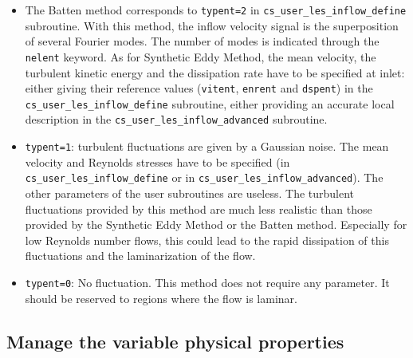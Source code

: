 {{{\begin{itemize}
\item The Batten method corresponds to \texttt{typent=2} in
  \texttt{cs\_user\_les\_inflow\_define} subroutine. With this method,
  the inflow velocity signal is the superposition of several Fourier
  modes. The number of modes is indicated through the
  \texttt{nelent} keyword. As   for Synthetic Eddy Method, the mean
  velocity, the turbulent kinetic energy and the dissipation rate have
  to be specified at inlet: either giving their reference values
  (\texttt{vitent}, \texttt{enrent} and \texttt{dspent}) in the
  \texttt{cs\_user\_les\_inflow\_define} subroutine, either providing
  an accurate local description in the
  \texttt{cs\_user\_les\_inflow\_advanced} subroutine.

\item \texttt{typent=1}: turbulent fluctuations are given by a Gaussian
  noise. The mean velocity and Reynolds stresses have to be specified
  (in \texttt{cs\_user\_les\_inflow\_define} or in
  \texttt{cs\_user\_les\_inflow\_advanced}). The other parameters of
  the user subroutines are useless. The turbulent fluctuations
  provided by this method are much less realistic than those provided
  by the Synthetic Eddy Method or the Batten method. Especially for
  low Reynolds number flows, this could lead to the rapid dissipation
  of this fluctuations and the laminarization of the flow.

\item \texttt{typent=0}: No fluctuation. This method does not require
  any parameter. It should be reserved to regions where the flow is
  laminar.
\end{itemize}

\subsection{Manage the variable physical properties}
}}}
